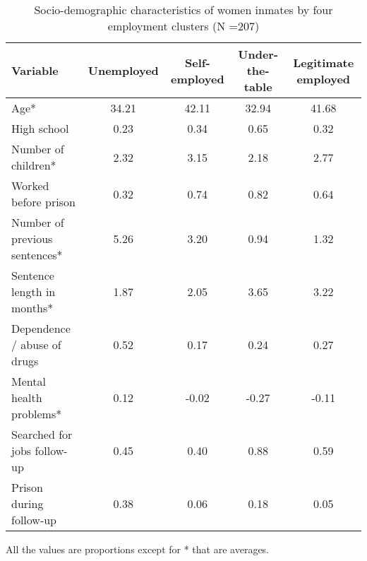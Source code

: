 \begin{table}[htp]
\footnotesize
\setlength{\tabcolsep}{10pt}
\renewcommand{\arraystretch}{1.3}
\begin{threeparttable}
\centering
\caption{Socio-demographic characteristics of women inmates \newline by four employment clusters (N =207)} 
\label{tab:descriptives_job_4}
\begin{tabular}{lcccc}
  \hline
Variable & Unemployed & Self-employed & Under-the-table & Legitimate employed \\ 
  \hline
Age* & 34.21 & 42.11 & 32.94 & 41.68 \\ 
  High school & 0.23 & 0.34 & 0.65 & 0.32 \\ 
  Number of children* & 2.32 & 3.15 & 2.18 & 2.77 \\ 
  Worked before prison & 0.32 & 0.74 & 0.82 & 0.64 \\ 
  Number of previous sentences* & 5.26 & 3.20 & 0.94 & 1.32 \\ 
  Sentence length in months* & 1.87 & 2.05 & 3.65 & 3.22 \\ 
  Dependence / abuse of drugs & 0.52 & 0.17 & 0.24 & 0.27 \\ 
  Mental health problems* & 0.12 & -0.02 & -0.27 & -0.11 \\ 
  Searched for jobs follow-up & 0.45 & 0.40 & 0.88 & 0.59 \\ 
  Prison during follow-up & 0.38 & 0.06 & 0.18 & 0.05 \\ 
   \hline
\end{tabular}
\begin{tablenotes}
\scriptsize
\item All the values are proportions except for * that are averages.
\end{tablenotes}
\end{threeparttable}
\end{table}

